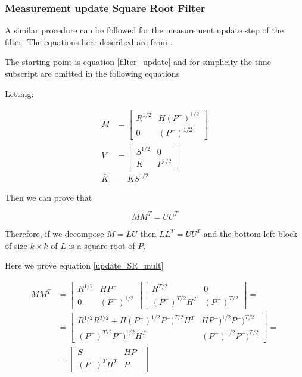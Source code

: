 \documentclass{article}
\let\Oldsubsubsection\subsubsection
\renewcommand{\subsubsection}{\FloatBarrier\Oldsubsubsection}
\begin{document}
\subsubsection{Measurement update Square Root Filter}

A similar procedure can be followed for the measurement update step of the filter. The equations here described are from \cite{dan_simon_optimal_2006}.

The starting point is equation \ref{filter_update} and for simplicity the time subscript are omitted in the following equations

Letting:

\begin{align}
    M &= \begin{bmatrix} R^{1/2} & H(P^-)^{1/2} \\ 0 & (P^-)^{1/2} \end{bmatrix} \\
    V &= \begin{bmatrix} S^{1/2} & 0 \\ \bar{K} & P^{1/2} \end{bmatrix} \\
    \bar{K} &= KS^{1/2}
\end{align}
    
Then we can prove that 

\begin{equation}\label{update_SR_mult}
    MM^T = UU^T
\end{equation}

Therefore, if we decompose $M=LU$ then $LL^T=UU^T$ and the bottom left block of size $k \times k$ of $L$ is a square root of $P$.

Here we prove equation \ref{update_SR_mult}

\begin{equation}
\begin{split}
    MM^T &= \begin{bmatrix} R^{1/2} & HP^- \\ 0 & (P^-)^{1/2} \end{bmatrix}\begin{bmatrix} R^{T/2} & 0 \\ (P^-)^{T/2}H^T & (P^-)^{T/2} \end{bmatrix}= \\
    &=\begin{bmatrix} R^{1/2}R^{T/2} + H(P^-)^{1/2}P^-)^{T/2}H^T & HP^-)^{1/2}P^-)^{T/2} \\ (P^-)^{T/2}P^-)^{1/2}H^T & (P^-)^{1/2}P^-)^{T/2} \end{bmatrix} = \\
    &=\begin{bmatrix}S & HP^- \\ (P^-)^TH^T & P^- \end{bmatrix}
\end{split}
\end{equation}
\end{document}
